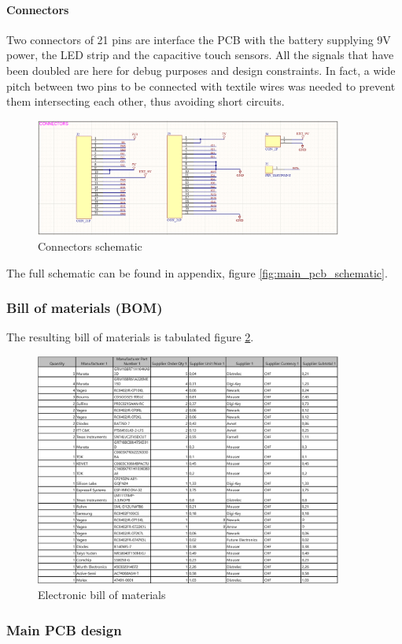 \paragraph{Connectors} Two connectors of 21 pins are interface the PCB with the battery supplying 9V power, the LED strip and the capacitive touch sensors. All the signals that have been doubled are here for debug purposes and design constraints. In fact, a wide pitch between two pins to be connected with textile wires was needed to prevent them intersecting each other, thus avoiding short circuits.

\begin{figure}[H]
    \centering
    \includegraphics[width=0.9\textwidth]{images/EE_Connectors.PNG}
    \caption{Connectors schematic}
    \label{fig:connectors_schematic}
\end{figure}

The full schematic can be found in appendix, figure \ref{fig:main_pcb_schematic}.


\subsubsection{Bill of materials (BOM)}
\label{subsubsec:main_pcb/bill_of_materials} 

The resulting bill of materials is tabulated figure \ref{fig:BOM}. 

\begin{figure}[H]
    \centering
    \includegraphics[width=0.9\textwidth]{images/EE_BOM.png}
    \caption{Electronic bill of materials}
    \label{fig:BOM}
\end{figure}

\subsubsection{Main PCB design}
\label{subsubsec:main_pcb/design} 


